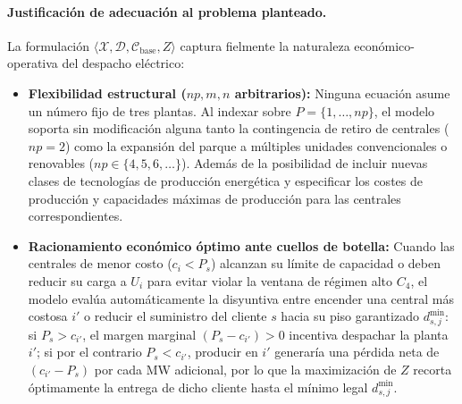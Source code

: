 \paragraph{Justificación de adecuación al problema planteado.}
La formulación $\langle \mathcal{X}, \mathcal{D}, \mathcal{C}_{\text{base}}, Z \rangle$ captura fielmente la naturaleza económico-operativa del despacho eléctrico:
\begin{itemize}
    \item \textbf{Flexibilidad estructural ($np, m, n$ arbitrarios):} Ninguna ecuación asume un número fijo de tres plantas. Al indexar sobre $P = \{1,\dots,np\}$, el modelo soporta sin modificación alguna tanto la contingencia de retiro de centrales ($np = 2$) como la expansión del parque a múltiples unidades convencionales o renovables ($np \in \{4, 5, 6, \dots\}$). Además de la posibilidad de incluir nuevas clases de tecnologías de producción energética y especificar los costes de producción y capacidades máximas de producción para las centrales correspondientes.
    
    \item \textbf{Racionamiento económico óptimo ante cuellos de botella:} Cuando las centrales de menor costo ($c_i < P_s$) alcanzan su límite de capacidad o deben reducir su carga a $U_i$ para evitar violar la ventana de régimen alto $C_4$, el modelo evalúa automáticamente la disyuntiva entre encender una central más costosa $i'$ o reducir el suministro del cliente $s$ hacia su piso garantizado $d^{\min}_{s,j}$: si $P_s > c_{i'}$, el margen marginal $(P_s - c_{i'}) > 0$ incentiva despachar la planta $i'$; si por el contrario $P_s < c_{i'}$, producir en $i'$ generaría una pérdida neta de $(c_{i'} - P_s)$ por cada MW adicional, por lo que la maximización de $Z$ recorta óptimamente la entrega de dicho cliente hasta el mínimo legal $d^{\min}_{s,j}$.
\end{itemize}

